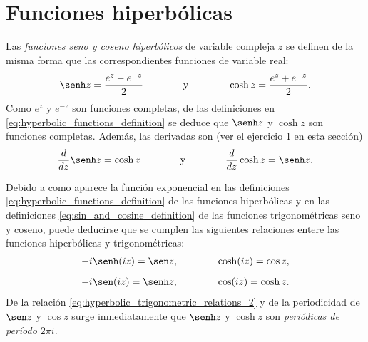 \documentclass[a4paper]{report}
\begin{document}
\section{Funciones hiperbólicas}

Las \emph{funciones seno y coseno hiperbólicos} de variable compleja \(z\) se definen de la misma forma que las correspondientes funciones de variable real:
\begin{equation}\label{eq:hyperbolic_functions_definition}
 \senh z=\frac{e^z-e^{-z}}{2}
 \qquad\qquad\textrm{y}\qquad\qquad
 \cosh z=\frac{e^z+e^{-z}}{2}. 
\end{equation}
Como \(e^z\) y \(e^{-z}\) son funciones completas, de las definiciones en \ref{eq:hyperbolic_functions_definition} se deduce que \(\senh z\) y \(\cosh z\) son funciones completas. Además, las derivadas son (ver el ejercicio 1 en esta sección)
\begin{equation}\label{eq:sinh_cosh_derivatives}
 \frac{d}{dz}\senh z=\cosh z
 \qquad\qquad\textrm{y}\qquad\qquad
 \frac{d}{dz}\cosh z=\senh z. 
\end{equation}

Debido a como aparece la función exponencial en las definiciones \ref{eq:hyperbolic_functions_definition} de las funciones hiperbólicas y en las definiciones \ref{eq:sin_and_cosine_definition} de las funciones trigonométricas seno y coseno, puede deducirse que se cumplen las siguientes relaciones entere las funciones hiperbólicas y trigonométricas: 
\begin{gather}
  -i\senh(iz)=\sen z,\qquad\qquad\cosh(iz)=\cos z,\label{eq:hyperbolic_trigonometric_relations_1}\\[\medskipamount]
  -i\sen(iz)=\senh z,\qquad\qquad\cos(iz)=\cosh z.\label{eq:hyperbolic_trigonometric_relations_2}
\end{gather}
De la relación \ref{eq:hyperbolic_trigonometric_relations_2} y de la periodicidad de \(\sen z\) y \(\cos z\) surge inmediatamente que \(\senh z\) y \(\cosh z\) son \emph{periódicas de período \(2\pi i\)}.
\end{document}
